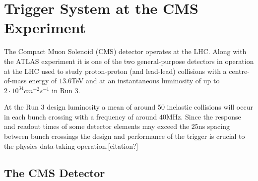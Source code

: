 
\section{\label{sec:CMS}Trigger System at the CMS Experiment}
The Compact Muon Solenoid (CMS) detector operates at the LHC\cite{collaboration2008cms}. Along with the ATLAS experiment it is one of the two general-purpose detectors in operation at the LHC used to study proton-proton (and lead-lead) collisions with a centre-of-mass energy of $13.6$TeV and at an instantaneous luminosity of up to $2 \cdot 10^{34} cm^{-2}s^{-1}$ in Run 3.
\par

At the Run 3 design luminosity a mean of around 50 inelastic collisions will occur in each bunch crossing with a frequency of around $40$MHz. Since the response and readout times of some detector elements may exceed the $25$ns spacing between bunch crossings the design and performance of the trigger is crucial to the physics data-taking operation.[citation?]


\subsection{The CMS Detector}



